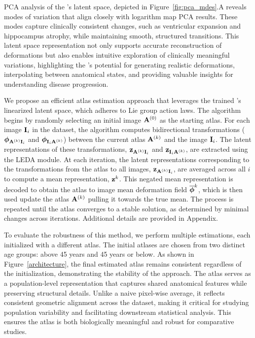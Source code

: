 PCA analysis of the \model's latent space, depicted in Figure~\ref{fig:pca_mdes}.A reveals modes of variation that align closely with logarithm map PCA results. These modes capture clinically consistent changes, such as ventricular expansion and hippocampus atrophy, while maintaining smooth, structured transitions. This latent space representation not only supports accurate reconstruction of deformations but also enables intuitive exploration of clinically meaningful variations, highlighting the \model's potential for generating realistic deformations, interpolating between anatomical states, and providing valuable insights for understanding disease progression.


We propose an efficient atlas estimation approach that leverages the trained \model's linearized latent space, which adheres to Lie group action laws. The algorithm begins by randomly selecting an initial image \( \mathbf{A}^{(0)} \) as the starting atlas. For each image \( \mathbf{I}_i \) in the dataset, the algorithm computes bidirectional transformations (\({\boldsymbol{\phi}}_{\mathbf{A}^{(k)}\mathbf{I}_i}\) and \({\boldsymbol{\phi}}_{\mathbf{I}_i\mathbf{A}^{(k)}}\)) between the current atlas \( \mathbf{A}^{(k)} \) and the image \( \mathbf{I}_i \). The latent representations of these transformations, \(\mathbf{z}_{\mathbf{A}^{(k)}\mathbf{I}_i}\) and \(\mathbf{z}_{\mathbf{I}_i\mathbf{A}^{(k)}}\), are extracted using the LEDA module.
At each iteration, the latent representations corresponding to the transformations from the atlas to all images, \(\mathbf{z}_{\mathbf{A}^{(k)}\mathbf{I}_i}\), are averaged across all \(i\) to compute a mean representation, \(\mathbf{z}^k\). This negated mean representation is decoded to obtain the atlas to image mean deformation field \(\overline{{\boldsymbol{\phi}}}^k\), which is then used update the atlas \( \mathbf{A}^{(k)} \) pulling it towards the true mean. The process is repeated until the atlas converges to a stable solution, as determined by minimal changes across iterations. Additional details are provided in Appendix.

To evaluate the robustness of this method, we perform multiple estimations, each initialized with a different atlas. The initial atlases are chosen from two distinct age groups: above 45 years and 45 years or below. As shown in Figure~\ref{architecture}, the final estimated atlas remains consistent regardless of the initialization, demonstrating the stability of the approach. The atlas serves as a population-level representation that captures shared anatomical features while preserving structural details. Unlike a naive pixel-wise average, it reflects consistent geometric alignment across the dataset, making it critical for studying population variability and facilitating downstream statistical analysis. This ensures the atlas is both biologically meaningful and robust for comparative studies.

